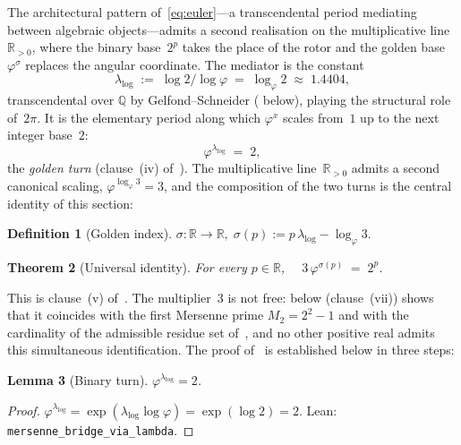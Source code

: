 \documentclass[11pt]{amsart}
\newtheorem{Theorem}{Theorem}[section]
\newtheorem{Lemma}[Theorem]{Lemma}
\theoremstyle{definition}
\newtheorem{Definition}[Theorem]{Definition}
\newcommand{\golden}{\varphi}
\newcommand{\lean}[1]{\texttt{#1}}
\begin{document}
The architectural pattern of~\eqref{eq:euler}---a transcendental
period mediating between algebraic objects---admits a second
realisation on the multiplicative line~$\mathbb{R}_{>0}$, where the
binary base~$2^{p}$ takes the place of the rotor and the golden base
$\golden^{\sigma}$ replaces the angular coordinate.  The mediator is
the constant
\[
  \lambda_{\log} \;:=\; \log 2/\log\golden
                  \;=\; \log_{\golden} 2 \;\approx\; 1.4404,
\]
transcendental over $\mathbb{Q}$ by Gelfond--Schneider
( below), playing the structural role
of~$2\pi$.  It is the elementary period along which $\golden^{x}$
scales from~$1$ up to the next integer base~$2$:
\begin{equation}\label{eq:golden-turn}
  \golden^{\lambda_{\log}} \;=\; 2,
\end{equation}
the \emph{golden turn} (clause~(iv) of~).
The multiplicative line~$\mathbb{R}_{>0}$ admits a second canonical
scaling, $\golden^{\log_{\golden} 3} = 3$, and the composition of the
two turns is the central identity of this section:

\begin{Definition}[Golden index]\label{def:sigma}
$\sigma\colon\mathbb{R}\to\mathbb{R},\;\sigma(p):=p\,\lambda_{\log}-\log_{\golden}3.$
\end{Definition}

\begin{Theorem}[Universal identity]\label{thm:universal}
For every $p\in\mathbb{R}$, $\quad 3\,\golden^{\sigma(p)} \;=\; 2^{p}$.
\end{Theorem}

\noindent This is clause~(v) of~.  The
multiplier~$3$ is not free:  below
(clause~(vii)) shows that it coincides with the first Mersenne prime $M_{2}=2^{2}-1$ and with the cardinality of the admissible residue set
of~, and no other positive real admits
this simultaneous identification.  The proof of~
is established below in three steps:

\begin{Lemma}[Binary turn]\label{lem:binary}
$\golden^{\lambda_{\log}} = 2$.
\end{Lemma}

\begin{proof}
$\golden^{\lambda_{\log}}=\exp(\lambda_{\log}\log\golden)=\exp(\log 2)=2$.
Lean: \lean{mersenne\_bridge\_via\_lambda}.
\end{proof}
\end{document}
